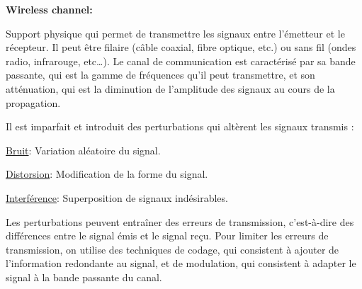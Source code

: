 \textbf{Wireless channel:}

Support physique qui permet de transmettre les signaux entre l'émetteur et le récepteur.
Il peut être filaire (câble coaxial, fibre optique, etc.) ou sans fil (ondes radio, infrarouge,
etc\dots). Le canal de communication est caractérisé par sa bande passante, qui est la gamme
de fréquences qu'il peut transmettre, et son atténuation, qui est la diminution de l'amplitude
des signaux au cours de la propagation.

Il est imparfait et introduit des perturbations qui altèrent les signaux transmis :

\underline{Bruit}: Variation aléatoire du signal.

\underline{Distorsion}: Modification de la forme du signal.

\underline{Interférence}: Superposition de signaux indésirables.

Les perturbations peuvent entraîner des erreurs de transmission, c'est-à-dire des différences
entre le signal émis et le signal reçu. Pour limiter les erreurs de transmission,
on utilise des techniques de codage, qui consistent à ajouter de l'information redondante
au signal, et de modulation, qui consistent à adapter le signal à la bande passante du canal.
